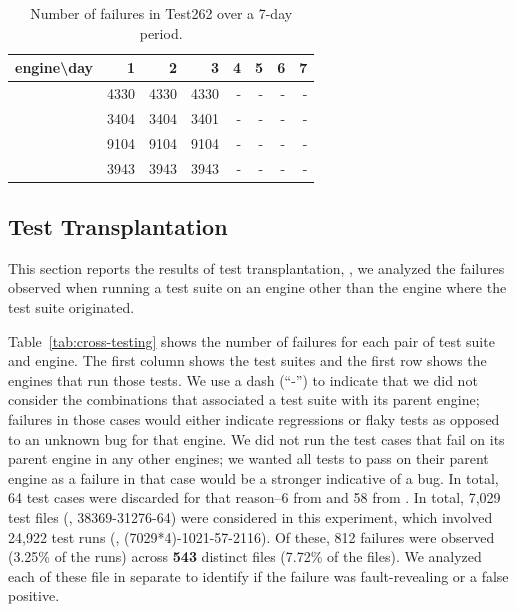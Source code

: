 \documentclass[10pt,conference,anonymous]{IEEEtran}
\begin{document}
\begin{table}[h]
  \centering
  \caption{\label{tab:test262}Number of failures in Test262 over
    a 7-day period.}
  \begin{tabular}{crrrrrrr}
    \toprule
    engine\textbackslash{}day& 1 & 2 & 3 & 4 & 5 & 6 & 7 \\
    \midrule
    \jsc{} & 4330 & 4330 & 4330 & - & - & - & - \\
    \veight{} & 3404 & 3404 & 3401 & - & - & - & - \\
    \chakra{} & 9104 & 9104 & 9104 & - & - & - & - \\
    \smonkey{} & 3943 & 3943 & 3943 & - & - & - & - \\
    \bottomrule 
  \end{tabular}
\end{table}



\subsection{Test Transplantation}
\label{sec:transplantation}


This section reports the results of test transplantation, \ie{}, we
analyzed the failures observed when running a test suite on an engine
other than the engine where the test suite
originated.

Table~\ref{tab:cross-testing} shows the number of failures for each
pair of test suite and engine. The first column shows the test suites
and the first row shows the engines that run those tests. We use a
dash (``-'') to indicate that we did not consider the combinations
that associated a test suite with its parent engine; failures in those
cases would either indicate regressions or flaky tests as opposed to
an unknown bug for that engine. We did not run the test cases that
fail on its parent engine in any other engines; we wanted all tests to
pass on their parent engine as a failure in that case would be a
stronger indicative of a bug. In total, 64 test cases were discarded
for that reason--6 from \jsc{} and 58 from \smonkey. In total, 7,029
test files (\ie{}, 38369-31276-64) were considered in this experiment,
which involved 24,922 test runs (\ie, (7029*4)-1021-57-2116).  Of
these, 812 failures were observed (3.25\% of the runs) across
\textbf{543} distinct files (7.72\% of the files). We analyzed each of
these file in separate to identify if the failure was fault-revealing
or a false positive.
\end{document}
